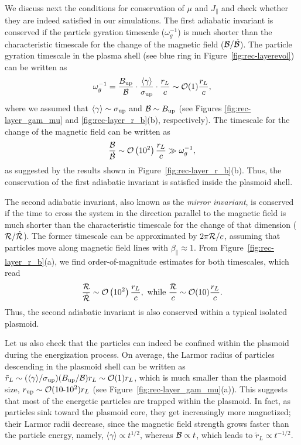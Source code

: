 We discuss next the conditions for conservation of $\mu$ and $J_{\parallel}$ and check whether they are indeed satisfied in our simulations. The first adiabatic invariant is conserved if the particle gyration timescale ($\omega_g^{-1}$) is much shorter than the characteristic timescale for the change of the magnetic field ($\mathcal{B}/\dot{\mathcal{B}}$). The particle gyration timescale in the plasma shell (see blue ring in Figure~\ref{fig:rec-layerevol}) can be written as
\begin{equation}
    \omega_g^{-1} = \frac{B_{\rm up}}{\mathcal{B}}\cdot
        \frac{\langle\gamma\rangle}{\sigma_{\rm up}}\cdot
        \frac{r_L}{c}
    \sim \mathcal{O}(1) \frac{r_L}{c},
\end{equation}
where we assumed that $\langle\gamma\rangle\sim\sigma_{\rm up}$ and $\mathcal{B}\sim B_{\rm up}$ (see Figures \ref{fig:rec-layer_gam_mu} and \ref{fig:rec-layer_r_b}(b), respectively).
The timescale for the change of the magnetic field can be written as
\begin{equation}
    \frac{\mathcal{B}}{\dot{\mathcal{B}}}\sim \mathcal{O}\left(10^2\right) 
        \frac{r_L}{c} \gg \omega_g^{-1},
\end{equation}
as suggested by the results shown in Figure~\ref{fig:rec-layer_r_b}(b). Thus, the conservation of the first adiabatic invariant is satisfied inside the plasmoid shell. 

The second adiabatic invariant, also known as the {\it mirror invariant}, is conserved if the time to cross the system in the direction parallel to the magnetic field  is much shorter than the characteristic timescale for the change of that dimension ($\mathcal{R}/\dot{\mathcal{R}}$). The former timescale can be approximated by $2\pi \mathcal{R}/c$, assuming that particles move along magnetic field lines with $\beta_\parallel \approx 1$. From Figure~\ref{fig:rec-layer_r_b}(a), we find order-of-magnitude estimates for both timescales, which read 
\begin{equation}
    \frac{\mathcal{R}}{\dot{\mathcal{R}}}\sim \mathcal{O}\left(10^2\right) \frac{r_L}{c},
    ~\text{while}~
    \frac{\mathcal{R}}{c} \sim \mathcal{O}(10) \frac{r_L}{c}.
\end{equation}
Thus, the second adiabatic invariant is also conserved within a typical isolated plasmoid.

Let us also check that the particles can indeed be confined within the plasmoid during the energization process. On average, the Larmor radius of particles descending in the plasmoid shell can be written as $\tilde{r}_L \sim (\langle\gamma\rangle/\sigma_{\rm up})(B_{\rm up}/\mathcal{B})r_L \sim \mathcal{O}(1)r_L$, which is much smaller than the plasmoid size, $r_{\rm up} \sim \mathcal{O}(10\text{-}10^2) r_L$ (see  Figure~\ref{fig:rec-layer_gam_mu}(a)). This suggests that most of the energetic particles are trapped within the plasmoid. In fact, as particles sink toward the plasmoid core, they get increasingly more magnetized;  their Larmor radii decrease, since the magnetic field strength grows faster than the particle energy, namely, $\langle\gamma\rangle\propto t^{1/2}$, whereas $\mathcal{B}\propto t$, which leads to $\tilde{r}_L\propto t^{-1/2}$.

